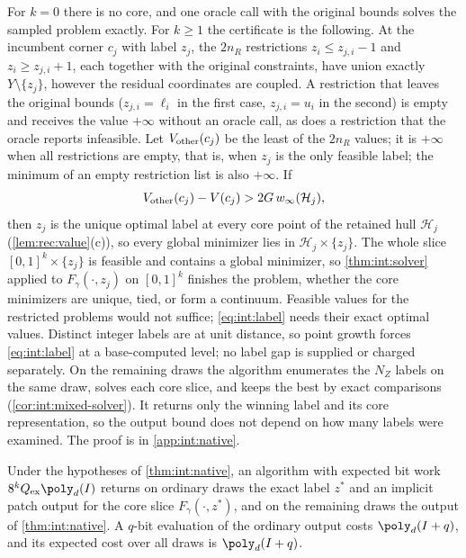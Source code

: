 For $k=0$ there is no core, and one oracle call with the original bounds
solves the sampled problem exactly. For $k\ge1$ the certificate is the
following. At the incumbent corner $c_j$ with label $z_j$, the $2n_R$
restrictions $z_i\le z_{j,i}-1$ and $z_i\ge z_{j,i}+1$, each together with
the original constraints, have union exactly $Y\setminus\{z_j\}$, however the
residual coordinates are coupled. A restriction that leaves the original
bounds ($z_{j,i}=\ell_i$ in the first case, $z_{j,i}=u_i$ in the second) is
empty and receives the value $+\infty$ without an oracle call, as does a
restriction that the oracle reports infeasible. Let $V_{\rm other}(c_j)$ be
the least of the $2n_R$ values; it is $+\infty$ when all restrictions are
empty, that is, when $z_j$ is the only feasible label; the minimum of an
empty restriction list is also $+\infty$. If
\begin{equation}\label{eq:int:label}
 V_{\rm other}(c_j)-V(c_j)>2G\,w_\infty(\mathcal H_j),
\end{equation}
then $z_j$ is the unique optimal label at every core point of the retained
hull $\mathcal H_j$ (\cref{lem:rec:value}(c)), so every global minimizer lies
in $\mathcal H_j\times\{z_j\}$. The whole slice $[0,1]^k\times\{z_j\}$ is
feasible and contains a global minimizer, so \cref{thm:int:solver} applied to
$F_\gamma(\cdot,z_j)$ on $[0,1]^k$ finishes the problem, whether the core
minimizers are unique, tied, or form a continuum. Feasible values for the
restricted problems would not suffice; \eqref{eq:int:label} needs their exact
optimal values. Distinct integer labels are at unit distance, so point growth
forces \eqref{eq:int:label} at a base-computed level; no label gap is supplied
or charged separately. On the remaining draws the algorithm enumerates the
$N_Z$ labels on the same draw, solves each core slice, and keeps the best by
exact comparisons (\cref{cor:int:mixed-solver}). It returns only the winning
label and its core representation, so the output bound does not depend on
how many labels were examined. The proof is in \cref{app:int:native}.

\begin{corollary}\label{cor:int:native-implicit}
Under the hypotheses of \cref{thm:int:native}, an algorithm with expected bit
work $8^kQ_{\rm ex}\poly_d(I)$ returns on ordinary draws the exact label $z^*$
and an implicit patch output for the core slice $F_\gamma(\cdot,z^*)$, and on
the remaining draws the output of \cref{thm:int:native}. A $q$-bit evaluation
of the ordinary output costs $\poly_d(I+q)$, and its expected cost over all
draws is $\poly_d(I+q)$.
\end{corollary}

